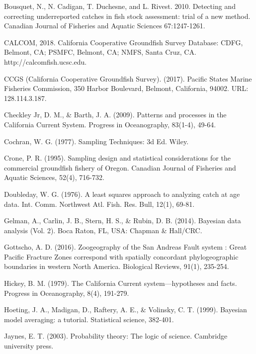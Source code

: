 \documentclass[12pt]{article}
\begin{document}
%
\begin{thebibliography}{1}
%
 Bousquet, N., N. Cadigan, T. Duchesne, and L. Rivest. 
2010. Detecting and correcting underreported catches in fish stock assessment: 
trial of a new method. Canadian Journal of Fisheries and Aquatic Sciences 
67:1247-1261.

 CALCOM, 2018. California Cooperative Groundfish Survey 
Database: CDFG, Belmont, CA; PSMFC, Belmont, CA; NMFS, Santa Cruz, CA. 
http://calcomfish.ucsc.edu.

%
 CCGS (California Cooperative Groundfish Survey). (2017). 
Pacific States Marine Fisheries Commission, 350 Harbor Boulevard, Belmont, 
California, 94002. URL:  128.114.3.187.

%
 Checkley Jr, D. M., \& Barth, J. A. (2009). Patterns and processes in 
the California Current System. Progress in Oceanography, 83(1-4), 49-64.

%
 Cochran, W. G. (1977). Sampling Techniques: 3d Ed. Wiley.

%
 Crone, P. R. (1995). Sampling design and statistical 
considerations for the commercial groundfish fishery of Oregon. Canadian 
Journal of Fisheries and Aquatic Sciences, 52(4), 716-732.

%
 Doubleday, W. G. (1976). A least squares approach to 
analyzing catch at age data. Int. Comm. Northwest Atl. Fish. Res. Bull, 12(1), 
69-81.

%
 Gelman, A., Carlin, J. B., Stern, H. S., \& Rubin, D. B. 
(2014). Bayesian data analysis (Vol. 2). Boca Raton, FL, USA: Chapman \& 
Hall/CRC.

%
 Gottscho, A. D. (2016). Zoogeography of the San Andreas Fault system
: Great Pacific Fracture Zones correspond with spatially concordant 
phylogeographic boundaries in western North America. Biological Reviews, 91(1), 
235-254.

%
 Hickey, B. M. (1979). The California Current 
system—hypotheses and facts. Progress in Oceanography, 8(4), 191-279.

%
 Hoeting, J. A., Madigan, D., Raftery, A. E., \& Volinsky, C. T. 
(1999). Bayesian model averaging: a tutorial. Statistical science, 382-401.

%
 Jaynes, E. T. (2003). Probability theory: The logic of 
science. Cambridge university press.


\end{thebibliography}
\end{document}
